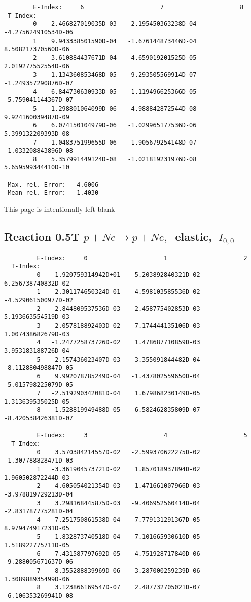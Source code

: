 \documentclass[12pt,dvipdfmx]{article}
\begin{document}
{\begin{small}
\begin{verbatim}
        E-Index:     6                     7                     8
 T-Index:
        0   -2.466827019035D-03    2.195450363238D-04   -4.275624910534D-06
        1    9.943338501590D-04   -1.676144873446D-04    8.508217370560D-06
        2    3.610884437671D-04   -4.659019201525D-05    2.019277552554D-06
        3    1.134360853468D-05    9.293505569914D-07   -1.249357290876D-07
        4   -6.844730630933D-05    1.119496625366D-05   -5.759041144367D-07
        5   -1.298801064099D-06   -4.988842872544D-08    9.924160039487D-09
        6    6.074150104979D-06   -1.029965177536D-06    5.399132209393D-08
        7   -1.048375199655D-06    1.905679254148D-07   -1.033208843896D-08
        8    5.357991449124D-08   -1.021819231976D-08    5.659599344410D-10

 Max. rel. Error:   4.6006
 Mean rel. Error:   1.4030

\end{verbatim}\end{small}
\newpage
This page is intentionally left blank
\newpage


\subsection{
Reaction 0.5T  $p + Ne \rightarrow p + Ne ,\ $
 elastic, $\  I_{0,0}$
}

\begin{small}\begin{verbatim}
         E-Index:     0                     1                     2
  T-Index:
         0   -1.920759314942D+01   -5.203892840321D-02    6.256738740832D-02
         1    2.301174650324D-01    4.598103585536D-02   -4.529061500977D-02
         2   -2.844809537536D-03   -2.458775402853D-03    5.193663554519D-03
         3   -2.057818892403D-02   -7.174444135106D-03    1.007438682679D-03
         4   -1.247725873726D-02    1.478687710859D-03    3.953183188726D-04
         5    2.157436023407D-03    3.355091844482D-04   -8.112880498847D-05
         6    9.992078785249D-04   -1.437802559650D-04   -5.015798225079D-05
         7   -2.519290342081D-04    1.679868230149D-05    1.313639535025D-05
         8    1.528819949488D-05   -6.582462835809D-07   -8.420538426381D-07

         E-Index:     3                     4                     5
  T-Index:
         0    3.570384214557D-02   -2.599370622275D-02   -1.307788828471D-03
         1   -3.361904573721D-02    1.857018937894D-02    1.960502872244D-03
         2    4.605054021354D-03   -1.471661007966D-03   -3.978819729213D-04
         3    3.298168445875D-03   -9.406952560414D-04   -2.831787775281D-04
         4   -7.251750861538D-04   -7.779131291367D-05    8.979474917231D-05
         5   -1.832873740518D-04    7.101665930610D-05    1.518922775711D-05
         6    7.431587797692D-05    4.751928717840D-06   -9.288005671637D-06
         7   -8.355288839969D-06   -3.287000259239D-06    1.308988935499D-06
         8    3.123866169547D-07    2.487732705021D-07   -6.106353269941D-08


\end{verbatim}
\end{small}}
\end{document}
